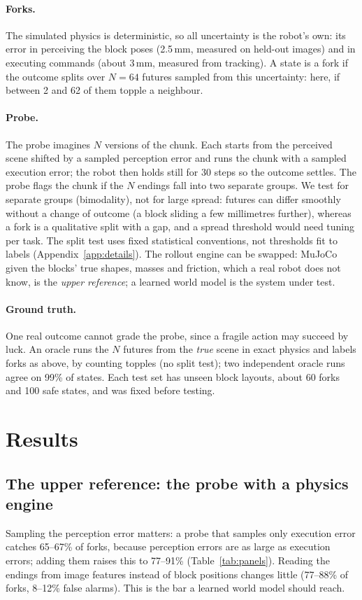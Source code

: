 \documentclass{article}
\begin{document}
\paragraph{Forks.} The simulated physics is deterministic, so all uncertainty is the robot's own: its
error in perceiving the block poses (2.5\,mm, measured on held-out images) and in executing commands
(about 3\,mm, measured from tracking). A state is a fork if the outcome splits over $N=64$ futures sampled
from this uncertainty: here, if between 2 and 62 of them topple a neighbour.

\paragraph{Probe.} The probe imagines $N$ versions of the chunk. Each starts from the perceived scene
shifted by a sampled perception error and runs the chunk with a sampled execution error; the robot then
holds still for 30 steps so the outcome settles. The probe flags the chunk if the $N$ endings fall into
two separate groups. We test for separate groups (bimodality), not for large spread: futures can differ
smoothly without a change of outcome (a block sliding a few millimetres further), whereas a fork is a
qualitative split with a gap, and a spread threshold would need tuning per task. The split test uses
fixed statistical conventions, not thresholds fit to labels (Appendix~\ref{app:details}). The rollout
engine can be swapped: MuJoCo given the blocks' true shapes, masses and friction, which a real robot does
not know, is the \emph{upper reference}; a learned world model is the system under test.

\paragraph{Ground truth.} One real outcome cannot grade the probe, since a fragile action may succeed by
luck. An oracle runs the $N$ futures from the \emph{true} scene in exact physics and labels forks as above,
by counting topples (no split test);
two independent oracle runs agree on 99\% of states. Each test set has unseen block layouts, about 60
forks and 100 safe states, and was fixed before testing.

\section{Results}
\subsection{The upper reference: the probe with a physics engine}\label{sec:validation}
Sampling the perception error matters: a probe that samples only execution error catches 65--67\% of
forks, because perception errors are as large as execution errors; adding them raises this to
77--91\% (Table~\ref{tab:panels}). Reading the endings from image features instead of block positions
changes little (77--88\% of forks, 8--12\% false alarms). This is the bar a learned world model should reach.
\end{document}
